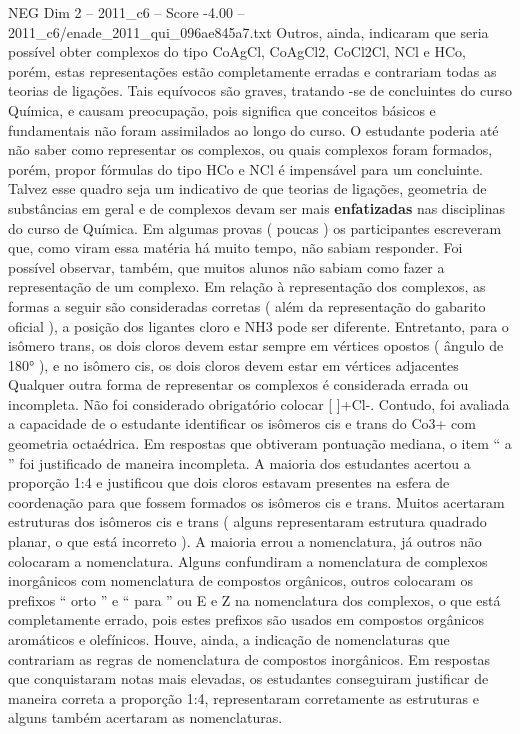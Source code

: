 \begin{textsample}{NEG Dim 2 – 2011\_c6 – Score -4.00 – 2011\_c6/enade\_2011\_qui\_096ae845a7.txt}
Outros, ainda, indicaram que seria possível obter complexos do tipo CoAgCl, CoAgCl2, CoCl2Cl, NCl e HCo, porém, estas representações estão completamente erradas e contrariam todas as teorias de ligações.
Tais equívocos são graves, tratando -se de concluintes do curso Química, e causam preocupação, pois significa que conceitos básicos e fundamentais não foram assimilados ao longo do curso.
O estudante poderia até não saber como representar os complexos, ou quais complexos foram formados, porém, propor fórmulas do tipo HCo e NCl é impensável para um concluinte.
Talvez esse quadro seja um indicativo de que teorias de ligações, geometria de substâncias em geral e de complexos devam ser mais \textbf{enfatizadas} nas disciplinas do curso de Química.
Em algumas provas ( poucas ) os participantes escreveram que, como viram essa matéria há muito tempo, não sabiam responder.
Foi possível observar, também, que muitos alunos não sabiam como fazer a representação de um complexo.
Em relação à representação dos complexos, as formas a seguir são consideradas corretas ( além da representação do gabarito oficial ), a posição dos ligantes cloro e NH3 pode ser diferente.
Entretanto, para o isômero trans, os dois cloros devem estar sempre em vértices opostos ( ângulo de 180{\EmojiFont °} ), e no isômero cis, os dois cloros devem estar em vértices adjacentes Qualquer outra forma de representar os complexos é considerada errada ou incompleta.
Não foi considerado obrigatório colocar [ ]+Cl-.
Contudo, foi avaliada a capacidade de o estudante identificar os isômeros cis e trans do Co3+ com geometria octaédrica.
Em respostas que obtiveram pontuação mediana, o item “ a ” foi justificado de maneira incompleta.
A maioria dos estudantes acertou a proporção 1:4 e justificou que dois cloros estavam presentes na esfera de coordenação para que fossem formados os isômeros cis e trans.
Muitos acertaram estruturas dos isômeros cis e trans ( alguns representaram estrutura quadrado planar, o que está incorreto ).
A maioria errou a nomenclatura, já outros não colocaram a nomenclatura.
Alguns confundiram a nomenclatura de complexos inorgânicos com nomenclatura de compostos orgânicos, outros colocaram os prefixos “ orto ” e “ para ” ou E e Z na nomenclatura dos complexos, o que está completamente errado, pois estes prefixos são usados em compostos orgânicos aromáticos e olefínicos.
Houve, ainda, a indicação de nomenclaturas que contrariam as regras de nomenclatura de compostos inorgânicos.
Em respostas que conquistaram notas mais elevadas, os estudantes conseguiram justificar de maneira correta a proporção 1:4, representaram corretamente as estruturas e alguns também acertaram as nomenclaturas.

\end{textsample}
